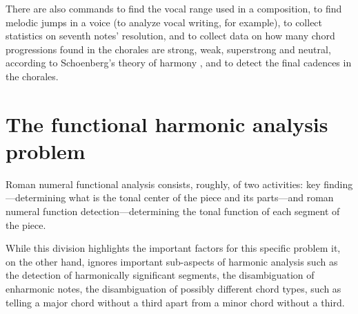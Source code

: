 There are also commands to find the vocal range used in a composition,
to find melodic jumps in a voice (to analyze vocal writing, for
example), to collect statistics on seventh notes' resolution, and to
collect data on how many chord progressions found in the chorales are
strong, weak, superstrong and neutral, according to Schoenberg's
theory of harmony \cite{schoenberg83:theory}, and to detect the final
cadences in the chorales.





\section{The functional harmonic analysis problem}
\label{sec:problem}

Roman numeral functional analysis consists, roughly, of two
activities: key finding---determining what is the tonal center of the
piece and its parts---and roman numeral function
detection---determining the tonal function of each segment of the
piece.

While this division highlights the important factors for this specific
problem it, on the other hand, ignores important sub-aspects of
harmonic analysis such as the detection of harmonically significant
segments, the disambiguation of enharmonic notes, the disambiguation
of possibly different chord types, such as telling a major chord
without a third apart from a minor chord without a third.


